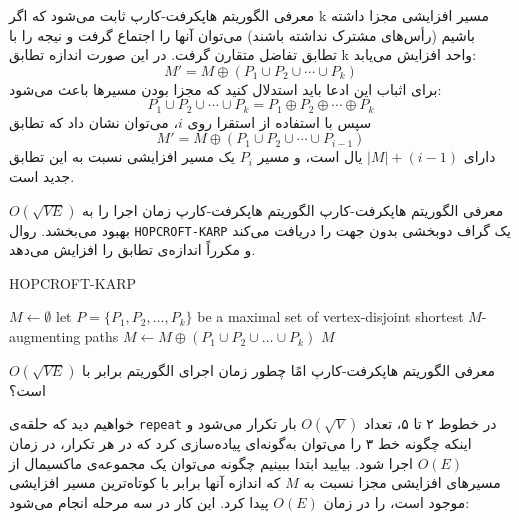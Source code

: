 \begin{itemframe}{‌معرفی الگوریتم هاپکرفت-کارپ}
\itm
ثابت می‌شود که اگر k مسیر افزایشی مجزا داشته باشیم (رأس‌های مشترک نداشته باشند) می‌توان آنها را اجتماع گرفت و نیجه را با تطابق تفاضل متقارن گرفت. در این صورت اندازه تطابق k واحد افزایش می‌یابد:
$$M' = M \oplus (P_1 \cup P_2 \cup \cdots \cup P_k)$$
\itm
برای اثباب این ادعا باید استدلال کنید که مجزا بودن مسیرها باعث می‌شود:
$$P_1 \cup P_2 \cup \cdots \cup P_k = P_1 \oplus P_2 \oplus \cdots \oplus P_k$$
سپس با استفاده از استقرا روی $i$، می‌توان نشان داد که تطابق
$$M' = M \oplus (P_1 \cup P_2 \cup \cdots \cup P_{i-1})$$
دارای $|M| + (i - 1)$ یال است، و مسیر $P_i$ یک مسیر افزایشی نسبت به این تطابق جدید است.
\end{itemframe}

\begin{itemframe}{‌معرفی الگوریتم هاپکرفت-کارپ}
\itm
الگوریتم هاپکرفت-کارپ زمان اجرا را به $O(\sqrt{V E})$ بهبود می‌بخشد. روال \texttt{HOPCROFT-KARP} یک گراف دوبخشی بدون جهت را دریافت می‌کند و مکرراً اندازه‌ی تطابق را افزایش می‌دهد.
\begin{algorithm}[H]\alglr
\caption{HOPCROFT-KARP}
\begin{algorithmic}[1]
	\State $M \gets \emptyset$
	\Repeat
        \State let $P = \{P_1, P_2, \ldots, P_k\}$ be a maximal set of vertex-disjoint shortest $M$-augmenting paths
		\State $M \gets M \oplus (P_1 \cup P_2 \cup \ldots \cup P_k)$
	\State \Return $M$
\end{algorithmic}
\end{algorithm}
\end{itemframe}

\begin{itemframe}{‌معرفی الگوریتم هاپکرفت-کارپ}
\itm
امًا چطور زمان اجرای الگوریتم برابر با $O(\sqrt{V E})$ است؟

خواهیم دید که حلقه‌ی \texttt{repeat} در خطوط ۲ تا ۵، تعداد $O(\sqrt{V})$ بار تکرار می‌شود و اینکه چگونه خط ۳ را می‌توان به‌گونه‌ای پیاده‌سازی کرد که در هر تکرار، در زمان $O(E)$ اجرا شود.
\itm
بیایید ابتدا ببینیم چگونه می‌توان یک مجموعه‌ی ماکسیمال از مسیرهای افزایشی مجزا نسبت به $M$ که اندازه آنها برابر با کوتاه‌ترین مسیر افزایشی موجود است، را در زمان $O(E)$ پیدا کرد. این کار در سه مرحله انجام می‌شود:

\end{itemframe}

